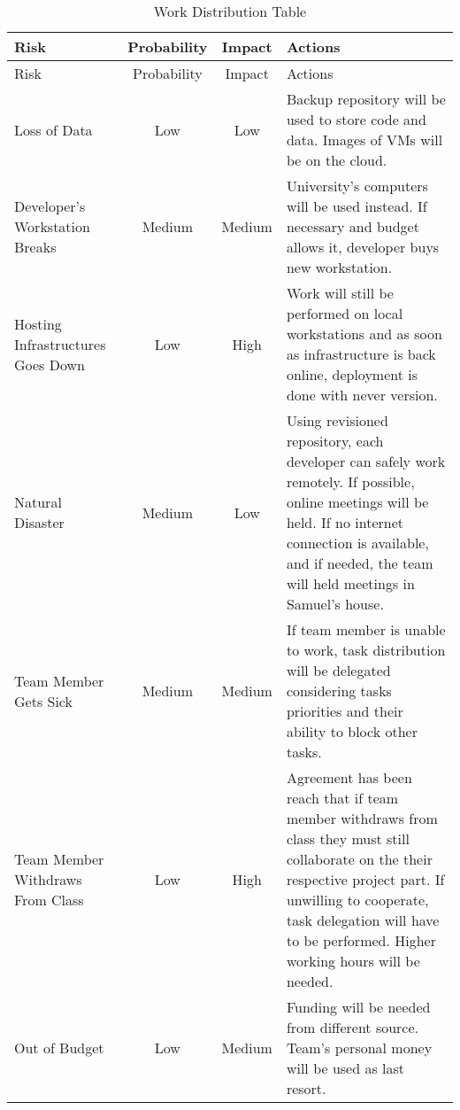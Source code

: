 \begin{center}
\setlength{\extrarowheight}{1.5pt}
    \begin{longtable}{|m{5cm}|c|c|m{5cm}|}
 \caption{Work Distribution Table} \\
     \hline
    
    \centering  Risk & Probability & Impact & Actions \\
    \hline \hline \endfirsthead
    
         \hline

	\centering  Risk & Probability & Impact & Actions \\    
	\hline \hline \endhead
    
    \endfoot  
Loss of Data    & Low           & Low      & Backup repository will be used to store code and data. Images of VMs will be on the cloud.       \\ \hline
Developer's Workstation Breaks  & Medium           & Medium      & University's computers will be used instead. If necessary and budget allows it, developer buys new workstation.       \\  \hline
    Hosting Infrastructures Goes Down    & Low           & High      & Work will still be performed on local workstations and as soon as infrastructure is back online, deployment is done with never version.       \\  \hline
    Natural Disaster    & Medium           & Low      & Using revisioned repository, each developer can safely work remotely. If possible, online meetings will be held. If no internet connection is available, and if needed, the team will held meetings in Samuel's house.       \\  \hline
    Team Member Gets Sick    & Medium           & Medium      & If team member is unable to work, task distribution will be delegated considering tasks priorities and their ability to block other tasks.       \\  \hline
    Team Member Withdraws From Class   & Low           & High      & Agreement has been reach that if team member withdraws from class they must still collaborate on the their respective project part. If unwilling to cooperate, task delegation will have to be performed. Higher working hours will be needed.       \\  \hline
    Out of Budget    & Low           & Medium      & Funding will be needed from different source. Team's personal money will be used as last resort.       \\  \hline
\end{longtable}
\end{center}
